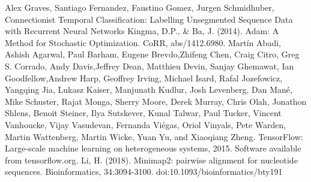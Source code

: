 \documentclass[a4paper,11pt,twoside]{report}
\theoremstyle{definition}
\begin{document}
\begin{thebibliography}{20}
Alex Graves, Santiago Fernandez, Faustino Gomez, Jurgen Schmidhuber, Connectionist Temporal Classification: Labelling Unsegmented Sequence Data with Recurrent Neural Networks
Kingma, D.P., \& Ba, J. (2014). Adam: A Method for Stochastic Optimization. CoRR, abs/1412.6980.
Martín Abadi, Ashish Agarwal, Paul Barham, Eugene Brevdo,Zhifeng Chen, Craig Citro, Greg S. Corrado, Andy Davis,Jeffrey Dean, Matthieu Devin, Sanjay Ghemawat, Ian Goodfellow,Andrew Harp, Geoffrey Irving, Michael Isard, Rafal Jozefowicz, Yangqing Jia, Lukasz Kaiser, Manjunath Kudlur, Josh Levenberg, Dan Mané, Mike Schuster, Rajat Monga, Sherry Moore, Derek Murray, Chris Olah, Jonathon Shlens, Benoit Steiner, Ilya Sutskever, Kunal Talwar, Paul Tucker, Vincent Vanhoucke, Vijay Vasudevan, Fernanda Viégas, Oriol Vinyals, Pete Warden, Martin Wattenberg, Martin Wicke, Yuan Yu, and Xiaoqiang Zheng. TensorFlow: Large-scale machine learning on heterogeneous systems, 2015. Software available from tensorflow.org.
 Li, H. (2018). Minimap2: pairwise alignment for nucleotide sequences. Bioinformatics, 34:3094-3100. doi:10.1093/bioinformatics/bty191
\end{thebibliography}

\thispagestyle{empty}




\listoffigures
\thispagestyle{empty}


\renewcommand{\listtablename}{Spis tabel}
\listoftables
\thispagestyle{empty}



\thispagestyle{empty}
\end{document}

